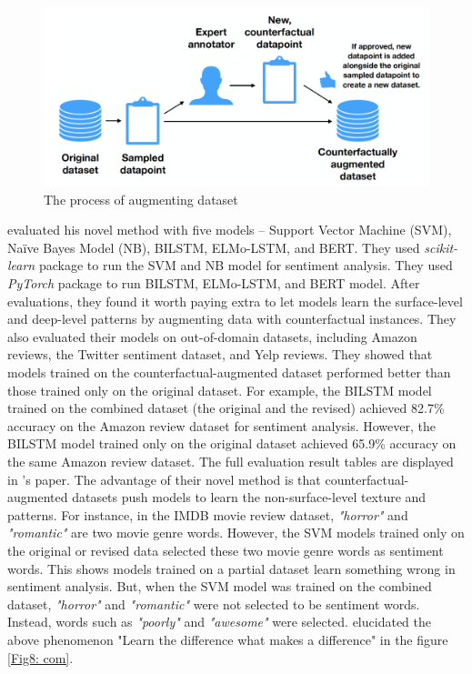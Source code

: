 \documentclass[aoas]{imsart}
\numberwithin{equation}{section}
\theoremstyle{plain}
\theoremstyle{remark}
\begin{document}
\begin{figure}[ht]
\includegraphics[scale=0.4]{img/aug.png}
\caption{The process of augmenting dataset}
\label{Fig7: aug}
\end{figure}

\cite{DBLP:journals/corr/abs-1909-12434} evaluated his novel method with five models – Support Vector Machine (SVM), Naïve Bayes Model (NB), BILSTM, ELMo-LSTM, and BERT. They used \textit{scikit-learn} package to run the SVM and NB model for sentiment analysis. They used \textit{PyTorch} package to run BILSTM, ELMo-LSTM, and BERT model. After evaluations, they found it worth paying extra to let models learn the surface-level and deep-level patterns by augmenting data with counterfactual instances. They also evaluated their models on out-of-domain datasets, including Amazon reviews, the Twitter sentiment dataset, and Yelp reviews. They showed that models trained on the counterfactual-augmented dataset performed better than those trained only on the original dataset. For example, the BILSTM model trained on the combined dataset (the original and the revised) achieved 82.7\% accuracy on the Amazon review dataset for sentiment analysis. However, the BILSTM model trained only on the original dataset achieved 65.9\% accuracy on the same Amazon review dataset. The full evaluation result tables are displayed in \cite{DBLP:journals/corr/abs-1909-12434}'s paper. The advantage of their novel method is that counterfactual-augmented datasets push models to learn the non-surface-level texture and patterns. For instance, in the IMDB movie review dataset, \textit{"horror"} and \textit{"romantic"} are two movie genre words. However, the SVM models trained only on the original or revised data selected these two movie genre words as sentiment words. This shows models trained on a partial dataset learn something wrong in sentiment analysis. But, when the SVM model was trained on the combined dataset, \textit{"horror"} and \textit{"romantic"} were not selected to be sentiment words. Instead, words such as \textit{"poorly"} and \textit{"awesome"} were selected. \cite{DBLP:journals/corr/abs-1909-12434} elucidated the above phenomenon "Learn the difference what makes a difference" in the figure \ref{Fig8: com}.
\end{document}
